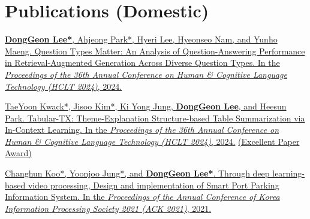 \documentclass[letterpaper,11pt]{article}
\begin{document}
    \section{Publications (Domestic)}
    \begin{enumerate}[noitemsep, leftmargin=*,label={[\arabic*]}]
        \item \href{https://koreascience.kr/article/CFKO202404272002603.page}{\textbf{DongGeon Lee*}, Ahjeong Park*, Hyeri Lee, Hyeonseo Nam, and Yunho Maeng. Question Types Matter: An Analysis of Question-Answering Performance in Retrieval-Augmented Generation Across Diverse Question Types. In the \textit{Proceedings of the 36th Annual Conference on Human \& Cognitive Language Technology (HCLT 2024)}, 2024.}
        \item \href{https://koreascience.kr/article/CFKO202404272003862.page}{TaeYoon Kwack*, Jisoo Kim*, Ki Yong Jung, \textbf{DongGeon Lee}, and Heesun Park. Tabular-TX: Theme-Explanation Structure-based Table Summarization via In-Context Learning. In the \textit{Proceedings of the 36th Annual Conference on Human \& Cognitive Language Technology (HCLT 2024)}, 2024.} \href{https://kli.korean.go.kr/benchmark/taskBoardsOrdtm/boardsOrdtm/noticeView.do?page=0&recordId=269&boardOrdtmId=&base.condition=boardOrdtm.title&base.keyword=&size=10}{(Excellent Paper Award)}
        \item \href{https://doi.org/10.3745/PKIPS.y2021m11a.1342}{Changhun Koo*, Yoonjoo Jung*, and \textbf{DongGeon Lee*}. Through deep learning-based video processing, Design and implementation of Smart Port Parking Information System. In the \textit{Proceedings of the Annual Conference of Korea Information Processing Society 2021 (ACK 2021)}, 2021.}
        
    \end{enumerate}

    
    
    

\end{document}
